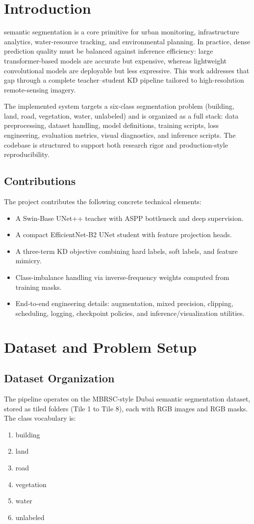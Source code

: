\documentclass[journal]{IEEEtran}
\begin{document}
\section{Introduction}
 semantic segmentation is a core primitive for urban monitoring, infrastructure analytics, water-resource tracking, and environmental planning. In practice, dense prediction quality must be balanced against inference efficiency: large transformer-based models are accurate but expensive, whereas lightweight convolutional models are deployable but less expressive. This work addresses that gap through a complete teacher--student KD pipeline tailored to high-resolution remote-sensing imagery.

The implemented system targets a six-class segmentation problem (building, land, road, vegetation, water, unlabeled) and is organized as a full stack: data preprocessing, dataset handling, model definitions, training scripts, loss engineering, evaluation metrics, visual diagnostics, and inference scripts. The codebase is structured to support both research rigor and production-style reproducibility.

\subsection{Contributions}
The project contributes the following concrete technical elements:
\begin{itemize}
    \item A Swin-Base UNet++ teacher with ASPP bottleneck and deep supervision.
    \item A compact EfficientNet-B2 UNet student with feature projection heads.
    \item A three-term KD objective combining hard labels, soft labels, and feature mimicry.
    \item Class-imbalance handling via inverse-frequency weights computed from training masks.
    \item End-to-end engineering details: augmentation, mixed precision, clipping, scheduling, logging, checkpoint policies, and inference/visualization utilities.
\end{itemize}

\section{Dataset and Problem Setup}
\subsection{Dataset Organization}
The pipeline operates on the MBRSC-style Dubai semantic segmentation dataset, stored as tiled folders (Tile 1 to Tile 8), each with RGB images and RGB masks. The class vocabulary is:
\begin{enumerate}
    \item building
    \item land
    \item road
    \item vegetation
    \item water
    \item unlabeled
\end{enumerate}
\end{document}
